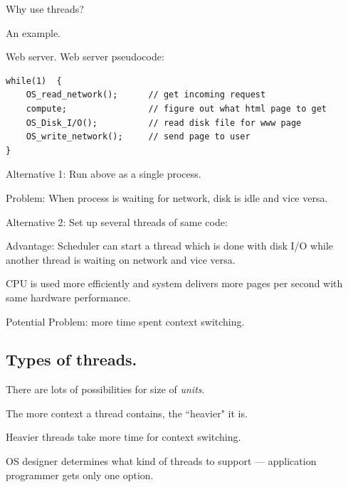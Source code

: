
Why use threads?

An example.

Web server.
Web server pseudocode:
\begin{verbatim}
while(1)  {
    OS_read_network();      // get incoming request
    compute;                // figure out what html page to get
    OS_Disk_I/O();          // read disk file for www page
    OS_write_network();	    // send page to user
}
\end{verbatim}


Alternative 1:  Run above as a single process.

Problem:  When process is waiting for network, disk is idle and vice versa.

Alternative 2:   Set up several threads of same code:

Advantage:   Scheduler can start a thread which is done with disk I/O while
another thread is waiting on network and vice versa.

CPU is used more efficiently and system delivers more pages per second with same hardware performance.

Potential Problem:  more time spent context switching.


\subsection{Types of threads.}

There are lots of possibilities for size of {\it units}.

The more context a thread contains, the ``heavier" it is.

Heavier threads take more time for context switching.

OS designer determines what kind of threads to support --- application programmer gets only one
option.




